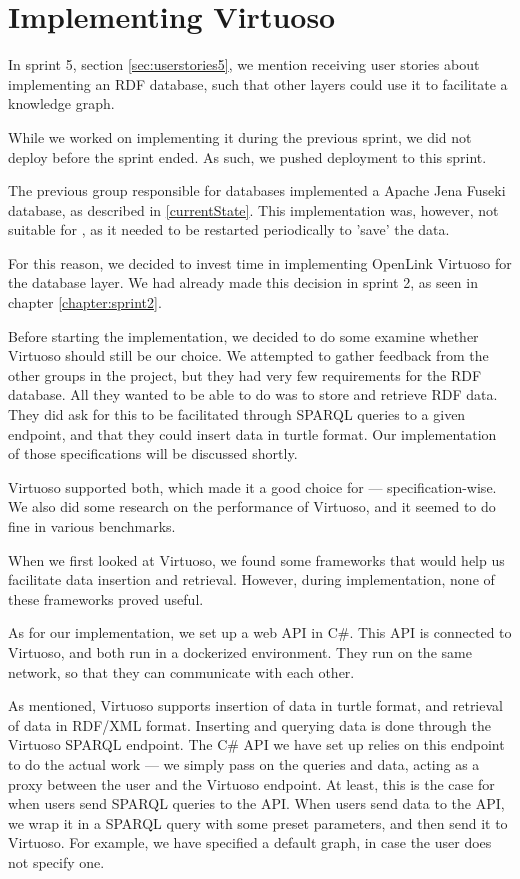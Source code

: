 \section{Implementing Virtuoso}
In sprint 5, section \ref{sec:userstories5}, we mention receiving user stories about implementing an RDF database, such that other \knox{} layers could use it to facilitate a knowledge graph.

While we worked on implementing it during the previous sprint, we did not deploy before the sprint ended. As such, we pushed deployment to this sprint.

The previous group responsible for \knox{} databases implemented a Apache Jena Fuseki database, as described in \ref{currentState}.
This implementation was, however, not suitable for \knox{}, as it needed to be restarted periodically to 'save' the data.

For this reason, we decided to invest time in implementing OpenLink Virtuoso for the \knox{} database layer. We had already made this decision in sprint 2, as seen in chapter \ref{chapter:sprint2}.

Before starting the implementation, we decided to do some examine whether Virtuoso should still be our choice.
We attempted to gather feedback from the other groups in the \knox{} project, but they had very few requirements for the RDF database. All they wanted to be able to do was to store and retrieve RDF data.
They did ask for this to be facilitated through SPARQL queries to a given endpoint, and that they could insert data in turtle format. Our implementation of those specifications will be discussed shortly.

Virtuoso supported both, which made it a good choice for \knox{} --- specification-wise. We also did some research on the performance of Virtuoso, and it seemed to do fine in various benchmarks\cite{addleseeComparingLinkedData2019}\cite{jovanovikBenchmarkingVirtuosoMighty2018}.

When we first looked at Virtuoso, we found some frameworks that would help us facilitate data insertion and retrieval. However, during implementation, none of these frameworks proved useful.

As for our implementation, we set up a web API in C\#. This API is connected to Virtuoso, and both run in a dockerized environment. They run on the same network, so that they can communicate with each other.

As mentioned, Virtuoso supports insertion of data in turtle format, and retrieval of data in RDF/XML format. Inserting and querying data is done through the Virtuoso SPARQL endpoint. The C\# API we have set up relies on this endpoint to do the actual work --- we simply pass on the queries and data, acting as a proxy between the user and the Virtuoso endpoint. At least, this is the case for when users send SPARQL queries to the API. When users send data to the API, we wrap it in a SPARQL query with some preset parameters, and then send it to Virtuoso. For example, we have specified a default graph, in case the user does not specify one.

